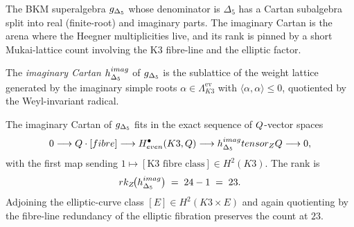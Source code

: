 The BKM superalgebra $g_{\Delta_5}$ whose denominator is $\Delta_5$
has a Cartan subalgebra split into real (finite-root) and imaginary
parts. The imaginary Cartan is the arena where the Heegner
multiplicities live, and its rank is pinned by a short
Mukai-lattice count involving the K3 fibre-line and the elliptic
factor.

\begin{definition}
\label{gluing:def:imaginary-cartan}
The \emph{imaginary Cartan} $h^{imag}_{\Delta_5}$ of
$g_{\Delta_5}$ is the sublattice of the weight lattice generated
by the imaginary simple roots $\alpha \in \Lambda_{K3}^{\mathrm{ev}}$
with $\langle \alpha, \alpha\rangle \leq 0$, quotiented by the
Weyl-invariant radical.
\end{definition}

\begin{proposition}
\label{gluing:prop:cartan-count}
The imaginary Cartan of $g_{\Delta_5}$ fits in the exact sequence
of $Q$-vector spaces
\[
 0 \longrightarrow Q \cdot [fibre]
 \longrightarrow H^\bullet_{even}(K3, Q)
 \longrightarrow h^{imag}_{\Delta_5} tensor_{Z} Q
 \longrightarrow 0,
\]
with the first map sending $1 \mapsto [\text{K3 fibre class}] \in
H^2(K3)$. The rank is
\[
 rk_{Z}\!\bigl(h^{imag}_{\Delta_5}\bigr) \;=\;
 24 - 1 \;=\; 23.
\]
Adjoining the elliptic-curve class $[E] \in H^2(K3 \times E)$ and
again quotienting by the fibre-line redundancy of the elliptic
fibration preserves the count at $23$.
\end{proposition}


